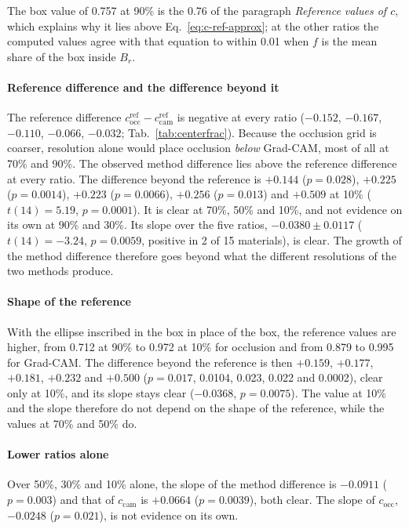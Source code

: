 The box value of 0.757 at 90\% is the 0.76 of the paragraph \emph{Reference values of
$c$}, which explains why it lies above Eq.~\eqref{eq:c-ref-approx}; at the other ratios
the computed values agree with that equation to within 0.01 when $f$ is the mean share
of the box inside $B_r$.

\paragraph{Reference difference and the difference beyond it}
The reference difference $c^{\mathrm{ref}}_{\mathrm{occ}} - c^{\mathrm{ref}}_{\mathrm{cam}}$
is negative at every ratio ($-0.152$, $-0.167$, $-0.110$, $-0.066$, $-0.032$;
Tab.~\ref{tab:centerfrac}). Because the occlusion grid is coarser, resolution alone
would place occlusion \emph{below} Grad-CAM, most of all at 70\% and 90\%. The observed
method difference lies above the reference difference at every ratio. The difference
beyond the reference is $+0.144$ ($p = 0.028$), $+0.225$ ($p = 0.0014$), $+0.223$
($p = 0.0066$), $+0.256$ ($p = 0.013$) and $+0.509$ at 10\% ($t(14) = 5.19$,
$p = 0.0001$). It is clear at 70\%, 50\% and 10\%, and not evidence on its own at 90\%
and 30\%. Its slope over the five ratios, $-0.0380 \pm 0.0117$ ($t(14) = -3.24$,
$p = 0.0059$, positive in 2 of 15 materials), is clear. The growth of the method
difference therefore goes beyond what the different resolutions of the two methods
produce.

\paragraph{Shape of the reference}
With the ellipse inscribed in the box in place of the box, the reference values are
higher, from 0.712 at 90\% to 0.972 at 10\% for occlusion and from 0.879 to 0.995 for
Grad-CAM. The difference beyond the reference is then $+0.159$, $+0.177$, $+0.181$,
$+0.232$ and $+0.500$ ($p = 0.017$, 0.0104, 0.023, 0.022 and 0.0002), clear only at
10\%, and its slope stays clear ($-0.0368$, $p = 0.0075$). The value at 10\% and the
slope therefore do not depend on the shape of the reference, while the values at 70\%
and 50\% do.

\paragraph{Lower ratios alone}
Over 50\%, 30\% and 10\% alone, the slope of the method difference is $-0.0911$
($p = 0.003$) and that of $c_{\mathrm{cam}}$ is $+0.0664$ ($p = 0.0039$), both clear.
The slope of $c_{\mathrm{occ}}$, $-0.0248$ ($p = 0.021$), is not evidence on its
own.

